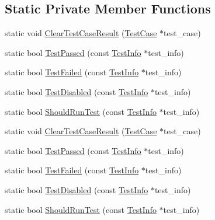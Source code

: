 \subsection*{\-Static \-Private \-Member \-Functions}
\begin{DoxyCompactItemize}
\item 
static void \hyperlink{classtesting_1_1TestCase_ad1d1fd605ca6c25a6f71b40c5216a8e0}{\-Clear\-Test\-Case\-Result} (\hyperlink{classtesting_1_1TestCase}{\-Test\-Case} $\ast$test\-\_\-case)
\item 
static bool \hyperlink{classtesting_1_1TestCase_a90cec168fde1398dfc3b1db6e1a797a4}{\-Test\-Passed} (const \hyperlink{classtesting_1_1TestInfo}{\-Test\-Info} $\ast$test\-\_\-info)
\item 
static bool \hyperlink{classtesting_1_1TestCase_a34e1cd8d648d9df54eedbb17f02587a4}{\-Test\-Failed} (const \hyperlink{classtesting_1_1TestInfo}{\-Test\-Info} $\ast$test\-\_\-info)
\item 
static bool \hyperlink{classtesting_1_1TestCase_a8cab09cdd57af464aec68c4dc9f45e96}{\-Test\-Disabled} (const \hyperlink{classtesting_1_1TestInfo}{\-Test\-Info} $\ast$test\-\_\-info)
\item 
static bool \hyperlink{classtesting_1_1TestCase_a8fdbfd24fea404421eb50c2450382e1d}{\-Should\-Run\-Test} (const \hyperlink{classtesting_1_1TestInfo}{\-Test\-Info} $\ast$test\-\_\-info)
\item 
static void \hyperlink{classtesting_1_1TestCase_ad1d1fd605ca6c25a6f71b40c5216a8e0}{\-Clear\-Test\-Case\-Result} (\hyperlink{classtesting_1_1TestCase}{\-Test\-Case} $\ast$test\-\_\-case)
\item 
static bool \hyperlink{classtesting_1_1TestCase_a90cec168fde1398dfc3b1db6e1a797a4}{\-Test\-Passed} (const \hyperlink{classtesting_1_1TestInfo}{\-Test\-Info} $\ast$test\-\_\-info)
\item 
static bool \hyperlink{classtesting_1_1TestCase_a34e1cd8d648d9df54eedbb17f02587a4}{\-Test\-Failed} (const \hyperlink{classtesting_1_1TestInfo}{\-Test\-Info} $\ast$test\-\_\-info)
\item 
static bool \hyperlink{classtesting_1_1TestCase_a8cab09cdd57af464aec68c4dc9f45e96}{\-Test\-Disabled} (const \hyperlink{classtesting_1_1TestInfo}{\-Test\-Info} $\ast$test\-\_\-info)
\item 
static bool \hyperlink{classtesting_1_1TestCase_a8fdbfd24fea404421eb50c2450382e1d}{\-Should\-Run\-Test} (const \hyperlink{classtesting_1_1TestInfo}{\-Test\-Info} $\ast$test\-\_\-info)
\end{DoxyCompactItemize}
